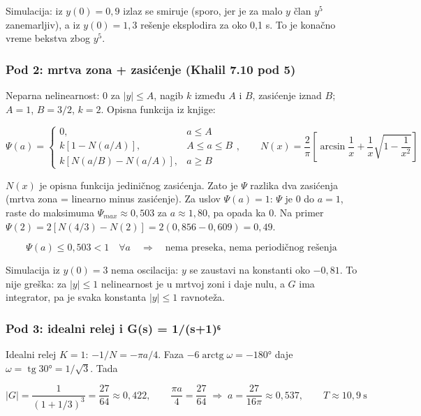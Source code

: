 \documentclass[11pt,a4paper,parskip=half,headsepline,numbers=noenddot]{scrartcl}
\begin{document}
Simulacija: iz \(y(0) = 0{,}9\) izlaz se smiruje (sporo, jer je za malo \(y\) član \(y^5\) zanemarljiv), a iz \(y(0) = 1{,}3\) rešenje eksplodira za oko 0,1 s. To je konačno vreme bekstva zbog \(y^5\).

\subsubsection{Pod 2: mrtva zona + zasićenje (Khalil 7.10 pod 5)}

Neparna nelinearnost: 0 za \(|y| \le A\), nagib \(k\) između \(A\) i \(B\), zasićenje iznad \(B\); \(A = 1\), \(B = 3/2\), \(k = 2\). Opisna funkcija iz knjige:

\[\Psi(a) = \begin{cases} 0, & a \le A \\ k\left[1 - N(a/A)\right], & A \le a \le B \\ k\left[N(a/B) - N(a/A)\right], & a \ge B \end{cases}, \qquad N(x) = \frac{2}{\pi}\left[\arcsin\frac{1}{x} + \frac{1}{x}\sqrt{1 - \frac{1}{x^2}}\right]\]

\(N(x)\) je opisna funkcija jediničnog zasićenja. Zato je \(\Psi\) razlika dva zasićenja (mrtva zona = linearno minus zasićenje). Za uslov \(\Psi(a) = 1\): \(\Psi\) je 0 do \(a = 1\), raste do maksimuma \(\Psi_{max} \approx 0{,}503\) za \(a \approx 1{,}80\), pa opada ka 0. Na primer \(\Psi(2) = 2[N(4/3) - N(2)] = 2(0{,}856 - 0{,}609) = 0{,}49\).

\[\Psi(a) \le 0{,}503 < 1 \quad \forall a \quad\Rightarrow\quad \text{nema preseka, nema periodičnog rešenja}\]

Simulacija iz \(y(0) = 3\) nema oscilacija: \(y\) se zaustavi na konstanti oko \(-0{,}81\). To nije greška: za \(|y| \le 1\) nelinearnost je u mrtvoj zoni i daje nulu, a \(G\) ima integrator, pa je svaka konstanta \(|y| \le 1\) ravnoteža.

\subsubsection{Pod 3: idealni relej i G(s) = 1/(s+1)⁶}

Idealni relej \(K = 1\): \(-1/N = -\pi a/4\). Faza \(-6\operatorname{arctg}\omega = -180°\) daje \(\omega = \operatorname{tg}30° = 1/\sqrt3\). Tada

\[|G| = \frac{1}{(1 + 1/3)^3} = \frac{27}{64} \approx 0{,}422, \qquad \frac{\pi a}{4} = \frac{27}{64} \;\Rightarrow\; a = \frac{27}{16\pi} \approx 0{,}537, \qquad T \approx 10{,}9\ \text{s}\]
\end{document}
